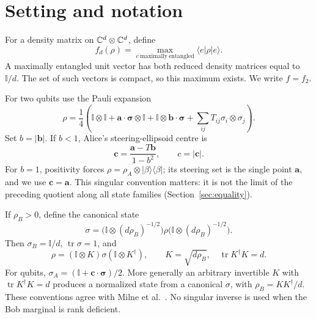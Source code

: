 \documentclass[11pt,a4paper]{article}
\theoremstyle{remark}\newtheorem{remark}[theorem]{Remark}
\DeclareMathOperator{\tr}{tr}\DeclareMathOperator{\diag}{diag}\DeclareMathOperator{\spec}{spec}
\newcommand{\ket}[1]{\lvert #1\rangle}\newcommand{\bra}[1]{\langle #1\rvert}
\newcommand{\Id}{\mathbb I}\newcommand{\HH}{\mathcal H}
\begin{document}
\section{Setting and notation}\label{sec:defs}
For a density matrix on $\mathbb C^d\otimes\mathbb C^d$, define
\[
 f_d(\rho)=\max_{e\ \mathrm{maximally\ entangled}}\bra e\rho\ket e.
\]
A maximally entangled unit vector has both reduced density matrices equal to
$\Id/d$. The set of such vectors is compact, so this maximum exists. We write
$f=f_2$.

For two qubits use the Pauli expansion
\[
 \rho=\frac14\left(\Id\otimes\Id+\bm a\cdot\bm\sigma\otimes\Id+
 \Id\otimes\bm b\cdot\bm\sigma+\sum_{ij}T_{ij}\sigma_i\otimes\sigma_j\right).
\]
Set $b=|\bm b|$. If $b<1$, Alice's steering-ellipsoid centre is
\[
 \bm c=\frac{\bm a-T\bm b}{1-b^2},\qquad c=|\bm c|.
\]
For $b=1$, positivity forces $\rho=\rho_A\otimes\ket\beta\bra\beta$; its
steering set is the single point $\bm a$, and we use $\bm c=\bm a$. This
singular convention matters: it is not the limit of the preceding quotient
along all state families (Section~\ref{sec:equality}).

If $\rho_B>0$, define the canonical state
\begin{equation}\label{eq:whiten}
 \sigma=\bigl(\Id\otimes(d\rho_B)^{-1/2}\bigr)\rho
          \bigl(\Id\otimes(d\rho_B)^{-1/2}\bigr).
\end{equation}
Then $\sigma_B=\Id/d$, $\tr\sigma=1$, and
\[
 \rho=(\Id\otimes K)\sigma(\Id\otimes K^\dagger),\qquad
 K=\sqrt{d\rho_B},\quad\tr K^\dagger K=d.
\]
For qubits, $\sigma_A=(\Id+\bm c\cdot\bm\sigma)/2$. More generally an
arbitrary invertible $K$ with $\tr K^\dagger K=d$ produces a normalized state
from a canonical $\sigma$, with $\rho_B=KK^\dagger/d$. These conventions
agree with Milne et al.~\cite{milne2014,ellipsoid2014}. No singular inverse
is used when the Bob marginal is rank deficient.
\end{document}
